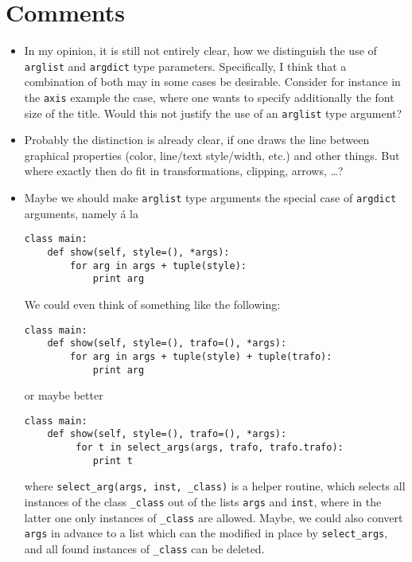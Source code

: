 \documentclass{article}
\begin{document}
\section*{Comments}

\begin{itemize}
\item In my opinion, it is still not entirely clear, how we
  distinguish the use of \verb|arglist| and \verb|argdict| type
  parameters. Specifically, I think that a combination of both may in
  some cases be desirable. Consider for instance in the \verb|axis|
  example the case, where one wants to specify additionally the font
  size of the title. Would this not justify the use of an
  \verb|arglist| type argument? 
\item Probably the distinction is already clear, if one draws the line
  between graphical properties (color, line/text style/width, etc.)
  and other things. But where exactly then do fit in transformations,
  clipping, arrows, \dots?
\item Maybe we should make \verb|arglist| type arguments the special
  case of \verb|argdict| arguments, namely \'a la 
\begin{verbatim}
class main:
    def show(self, style=(), *args):
        for arg in args + tuple(style):
            print arg

\end{verbatim}
We could even think of something like the following:
\begin{verbatim}
class main:
    def show(self, style=(), trafo=(), *args):
        for arg in args + tuple(style) + tuple(trafo):
            print arg

\end{verbatim}
or maybe better 
\begin{verbatim}
class main:
    def show(self, style=(), trafo=(), *args):
         for t in select_args(args, trafo, trafo.trafo):
            print t

\end{verbatim}
where \verb|select_arg(args, inst, _class)| is a helper routine, which
selects all instances of the class \verb|_class| out of the lists
\verb|args| and \verb|inst|, where in the latter one only instances of
\verb|_class| are allowed. Maybe, we could also convert \verb|args| in
advance to a list which can the modified in place by
\verb|select_args|, and all found instances of \verb|_class| can be deleted.

\end{itemize}
\end{document}
